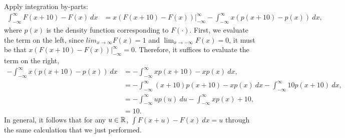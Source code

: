 \begin{problem}{9}
\end{problem}
\begin{solution}
    Apply integration by-parts:
    \begin{align*}
        \int_{-\infty}^\infty F(x+10) - F(x)~dx &= x(F(x+10) - F(x)) \Big\vert_{-\infty}^\infty - \int_{-\infty}^\infty x(p(x+10) - p(x))~dx, 
    \end{align*}
    where $p(x)$ is the density function corresponding to $F(\cdot)$. First, we evaluate the term on the left, since $lim_{x\to\infty} F(x) = 1$ and $\lim_{x\to-\infty} F(x) = 0$, it must be that $x(F(x+10) - F(x)) \Big\vert_{-\infty}^\infty = 0$. Therefore, it suffices to evaluate the term on the right, 
    \begin{align*}
        -\int_{-\infty}^\infty x(p(x+10) - p(x))~dx &= -\int_{-\infty}^\infty xp(x+10) - xp(x)~dx, \\
        &= -\int_{-\infty}^\infty (x+10)p(x+10) - xp(x)~dx - \int_{-\infty}^\infty 10p(x+10)~dx, \\
        &= -\int_{-\infty}^\infty up(u)~du - \int_{-\infty}^\infty xp(x) + 10, \\
        &= 10.
    \end{align*}
    In general, it follows that for any $u \in \mathbb{R}$, $\int F(x + u) - F(x)~dx = u$ through the same calculation that we just performed. 
\end{solution}

\begin{problem}{10}
\end{problem}
\begin{solution}
\end{solution}

\begin{problem}{11}
\end{problem}
\begin{solution}
\end{solution}

